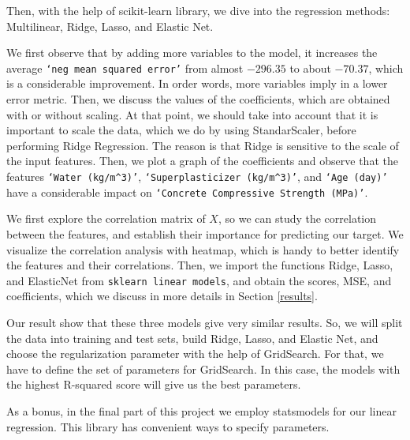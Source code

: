 \documentclass[a4paper,11pt]{amsart}
\begin{document}
\medbreak

Then, with the help of scikit-learn library, we dive into the regression methods: Multilinear, Ridge, Lasso, and Elastic Net.

\medbreak

 We first observe that by adding more variables to the model, it increases the average \texttt{`neg mean squared error'} from almost $-296.35$ to about $-70.37$, which is a considerable improvement. In order words, more variables imply in a lower error metric. Then, we discuss the values of the coefficients, which are obtained with or without scaling. At that point, we should take into account that it is important to scale the data, which we do by using StandarScaler, before performing Ridge Regression. The reason is that Ridge is sensitive to the scale of the input features. Then, we plot a graph of the coefficients and observe that the features \texttt{`Water ($kg/m^3$)'}, \texttt{`Superplasticizer ($kg/m^3$)'}, and \texttt{`Age (day)'} have a considerable impact on \texttt{`Concrete Compressive Strength (MPa)'}.

\medbreak

 We first explore the correlation matrix of $X$, so we can study the correlation between the features, and establish their importance for predicting our target. We visualize the correlation analysis with heatmap, which is handy to better identify the features and their correlations. Then, we import the functions Ridge, Lasso, and ElasticNet from \texttt{sklearn linear models}, and obtain the scores, MSE, and coefficients, which we discuss in more details in Section \ref{results}. 

\medbreak

 Our result show that these three models give very similar results. So, we will split the data into training and test sets, build Ridge, Lasso, and Elastic Net, and choose the regularization parameter with the help of GridSearch. For that, we have to define the set of parameters for GridSearch. In this case, the models with the highest R-squared score will give us the best parameters.

\medbreak

 As a bonus, in the final part of this project we employ statsmodels  for our linear regression. This library has convenient ways to specify parameters. 
\end{document}
